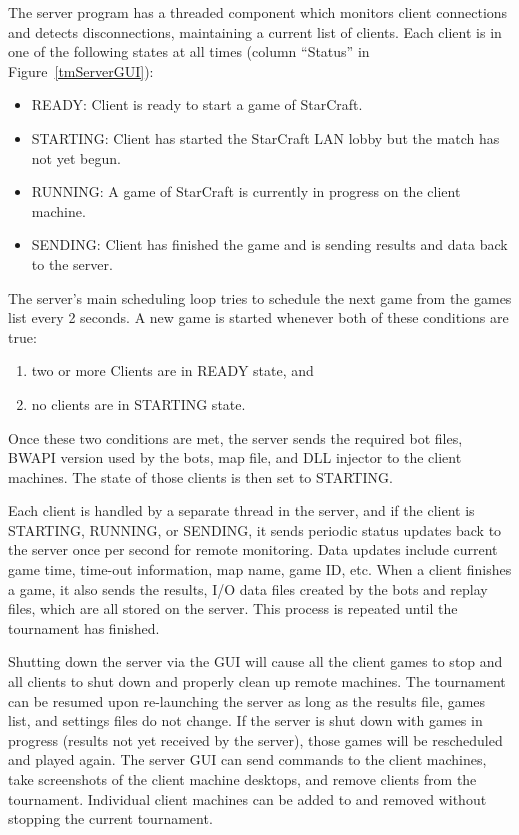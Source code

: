 The server program has a threaded component which monitors client connections and detects disconnections, maintaining a current list of clients. Each client is in one of the following states at all times (column ``Status'' in Figure~\ref{tmServerGUI}):

\begin{itemize}
\item READY: Client is ready to start a game of StarCraft.
\item STARTING: Client has started the StarCraft LAN lobby but the match has not yet begun.
\item RUNNING: A game of StarCraft is currently in progress on the client machine.
\item SENDING: Client has finished the game and is sending results and data back to the server.
\end{itemize}

The server's main scheduling loop tries to schedule the next game from the games list every 2 seconds. A new game is started whenever both of these conditions are true:

\begin{enumerate}
\item two or more Clients are in READY state, and
\item no clients are in STARTING state.
\end{enumerate}

\noindent Once these two conditions are met, the server sends the required bot files, BWAPI version used by the bots, map file, and DLL injector to the client machines. The state of those clients is then set to STARTING.

Each client is handled by a separate thread in the server, and if the client is STARTING, RUNNING, or SENDING, it sends periodic status updates back to the server once per second for remote monitoring. Data updates include current game time, time-out information, map name, game ID, etc. When a client finishes a game, it also sends the results, I/O data files created by the bots and replay files, which are all stored on the server. This process is repeated until the tournament has finished.

Shutting down the server via the GUI will cause all the client games to stop and all clients to shut down and properly clean up remote machines. The tournament can be resumed upon re-launching the server as long as the results file, games list, and settings files do not change. If the server is shut down with games in progress (results not yet received by the server), those games will be rescheduled and played again. The server GUI can send commands to the client machines, take screenshots of the client machine desktops, and remove clients from the tournament. Individual client machines can be added to and removed without stopping the current tournament.

